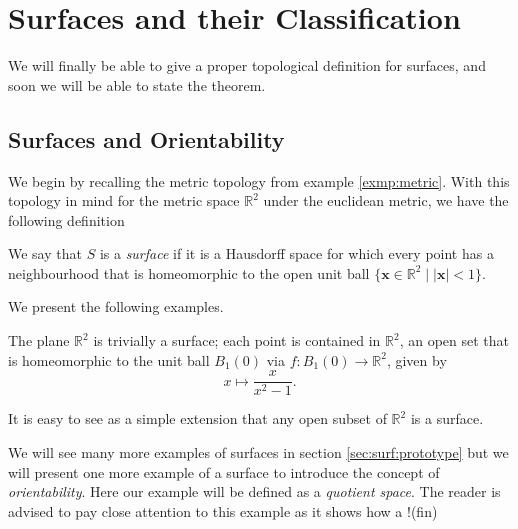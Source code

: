 

\section{Surfaces and their Classification}
\label{sec:surf}

We will finally be able to give a proper topological definition for
surfaces, and soon we will be able to state the theorem.

\subsection{Surfaces and Orientability}
\label{sec:surf:surfaces}

We begin by recalling the metric topology from example
\ref{exmp:metric}. With this topology in mind for the metric space
$\mathbb{R}^2$ under the euclidean metric, we have the following
definition

\begin{defn}
  We say that $S$ is a \emph{surface} if it is a Hausdorff space for
  which every point has a neighbourhood that is homeomorphic to the
  open unit ball $\{\mathbf{x} \in \mathbb{R}^2 \mid \lvert \mathbf{x}
  \rvert < 1 \}$.
\end{defn}

We present the following examples.

\begin{exmp}
  The plane $\mathbb{R}^2$ is trivially a surface; each point is
  contained in $\mathbb{R}^2$, an open set that is homeomorphic to the
  unit ball $B_1(0)$ via $f:B_1(0) \rightarrow \mathbb{R}^2$, given by
  \[
    x \mapsto \frac{x}{x^2 - 1}.
  \]

  It is easy to see as a simple extension that any open subset of
  $\mathbb{R}^2$ is a surface.
\end{exmp}


We will see many more examples of surfaces in section
\ref{sec:surf:prototype} but we will present one more example of a
surface to introduce the concept of \emph{orientability}. Here our
example will be defined as a \emph{quotient space}. The reader is
advised to pay close attention to this example as it shows how a !(fin)

